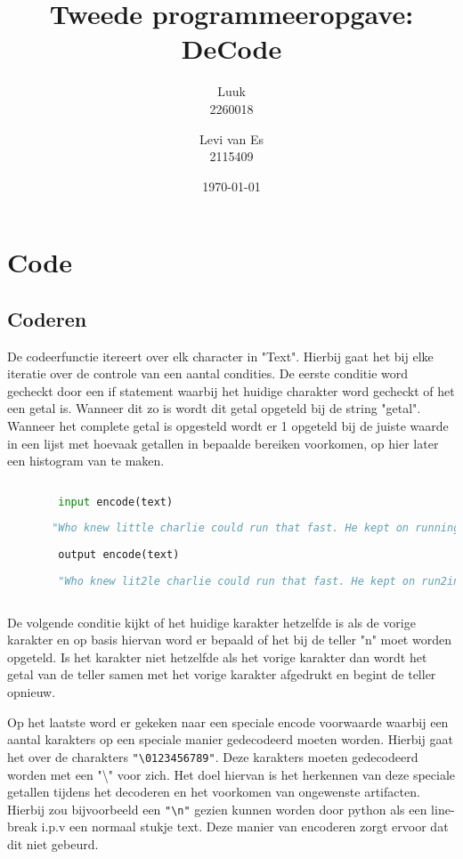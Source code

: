 \documentclass{article}
\title{Tweede programmeeropgave: DeCode}
\author{Luuk\\2260018\and Levi van Es\\2115409 }
\date{\today}
\begin{document}
\maketitle

\section{Code}

    \subsection{Coderen}
       De codeerfunctie itereert over elk character in "Text".
			 Hierbij gaat het bij elke iteratie over de controle van een
			 aantal condities.
			 De eerste conditie word gecheckt door een if statement waarbij
			 het huidige charakter word gecheckt of het een getal is.
			 Wanneer dit zo is wordt dit getal
			 opgeteld bij de string "getal".
			 Wanneer het complete getal is opgesteld wordt er 1 opgeteld bij
			 de juiste waarde in een lijst met hoevaak getallen in bepaalde bereiken
			 voorkomen, op hier later een histogram van te maken.
       
       
       \begin{lstlisting}[frame=single, language=python]  % Start your code-block
        
        input encode(text)
        
       "Who knew little charlie could run that fast. He kept on running faster fasteer and fasteeeeeerr !"
        
        output encode(text) 
        
        "Who knew lit2le charlie could run that fast. He kept on run2ing faster faste2r and faste6r2 !"
 

        \end{lstlisting}

       
       De volgende conditie kijkt of het huidige karakter hetzelfde is als de vorige karakter en op basis hiervan word er bepaald of het bij de teller "n" moet worden opgeteld. Is het karakter niet hetzelfde als het vorige karakter dan wordt het getal van de teller samen met het vorige karakter afgedrukt en begint de teller opnieuw.
       \newline
       
       Op het laatste word er gekeken naar een speciale encode voorwaarde
			 waarbij een aantal karakters op een speciale manier gedecodeerd moeten worden.
			 Hierbij gaat het over de charakters \texttt{"\textbackslash0123456789"}.
			 Deze karakters moeten gedecodeerd worden met een "\textbackslash" voor zich.
			 Het doel hiervan is het herkennen van deze speciale getallen tijdens het
			 decoderen en het voorkomen van ongewenste artifacten.
			 Hierbij zou bijvoorbeeld een \texttt{"\textbackslash n"}
			 gezien kunnen worden door python als
			 een line-break i.p.v een normaal stukje text. Deze manier van encoderen
			 zorgt ervoor dat dit niet gebeurd.
       
\end{document}
